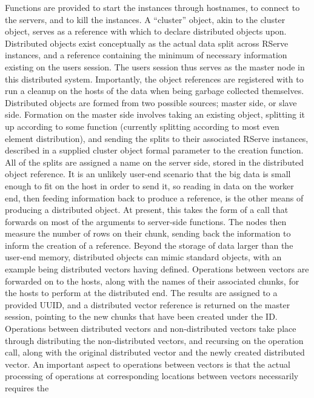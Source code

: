 Functions are provided to start the instances through hostnames, to
connect to the servers, and to kill the instances. A ``cluster'' object,
akin to the  cluster object, serves as a reference with which
to declare distributed objects upon. Distributed objects exist
conceptually as the actual data split across RServe instances, and a
reference containing the minimum of necessary information existing on
the users \R{} session. The users \R{} session thus serves as the master node
in this distributed system. Importantly, the object references are
registered with  to run a cleanup on the hosts of
the data when being garbage collected themselves. Distributed objects
are formed from two possible sources; master side, or slave side.
Formation on the master side involves taking an existing \R{} object,
splitting it up according to some function (currently splitting
according to most even element distribution), and sending the splits to
their associated RServe instances, described in a supplied cluster
object formal parameter to the creation function. All of the splits are
assigned a name on the server side, stored in the distributed object
reference. It is an unlikely user-end scenario that the big data is
small enough to fit on the host in order to send it, so reading in data
on the worker end, then feeding information back to produce a reference,
is the other means of producing a distributed object. At present, this
takes the form of a  call that forwards on
most of the arguments to server-side  functions. The
nodes then measure the number of rows on their chunk, sending back the
information to inform the creation of a reference. Beyond the storage of
data larger than the user-end memory, distributed objects can mimic
standard \R{} objects, with an example being distributed vectors having
 defined. Operations between vectors are forwarded on to the
hosts, along with the names of their associated chunks, for the hosts to
perform at the distributed end. The results are assigned to a provided
UUID, and a distributed vector reference is returned on the master
session, pointing to the new chunks that have been created under the ID.
Operations between distributed vectors and non-distributed vectors take
place through distributing the non-distributed vectors, and recursing on
the operation call, along with the original distributed vector and the
newly created distributed vector. An important aspect to operations
between vectors is that the actual processing of operations at
corresponding locations between vectors necessarily requires the
